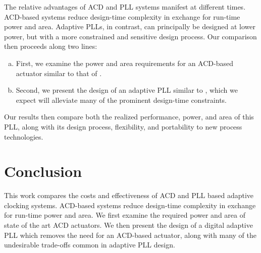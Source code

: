 \documentclass[twoside,9pt,journal,letterpage]{IEEEtran}
\begin{document}
The relative advantages of ACD and PLL systems manifest at different times. ACD-based systems reduce design-time complexity in exchange for run-time power and area. Adaptive PLLs, in contrast, can principally be designed at lower power, but with a more constrained and sensitive design process. Our comparison then proceeds along two lines:

\begin{enumerate}[(a)]
\item First, we examine the power and area requirements for an ACD-based actuator similar to that of \cite{wilcox2015}.
\item Second, we present the design of an adaptive PLL similar to \cite{hashimoto2018}, which we expect will alleviate many of the prominent design-time constraints. 
\end{enumerate}

Our results then compare both the realized performance, power, and area of this PLL, along with its design process, flexibility, and portability to new process technologies. 

\section{Conclusion}
\label{sec:conclusion}

This work compares the costs and effectiveness of ACD and PLL based adaptive clocking systems. ACD-based systems reduce design-time complexity in exchange for run-time power and area. We first examine the required power and area of state of the art ACD actuators. We then present the design of a digital adaptive PLL which removes the need for an ACD-based actuator, along with many of the undesirable trade-offs common in adaptive PLL design.



\begingroup
\raggedright

\endgroup
\end{document}
